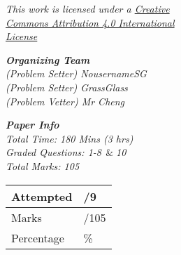 {\begin{multicols*}{2}
  \vspace*{5pt}

  \textit{This work is licensed under a \href{http://creativecommons.org/licenses/by/4.0/}{Creative \\ \hspace*{12pt} Commons Attribution 4.0 International \\ \hspace*{12pt} License}}

  \textit{\textbf{\Large{Organizing Team}} \\
        \large
        \hspace*{12pt} (Problem Setter) NousernameSG \\
        \hspace*{12pt} (Problem Setter) GrassGlass \\
        \hspace*{12pt} (Problem Vetter) Mr Cheng \\
  }

  \textit{\textbf{\Large{Paper Info}} \\
        \large
        \hspace*{12pt} Total Time: 180 Mins (3 hrs) \\
        \hspace*{12pt} Graded Questions: 1-8\(\;\,\&\;\)10 \\
        \hspace*{12pt} Total Marks: 105
  }
        \vspace*{5pt}

        \begin{tabularx}{0.37\textwidth} {
          | >{\centering\arraybackslash}X
          | >{\centering\arraybackslash}X | }
          \hline
          Attempted & \phantom{9}/9 \\
          \hline
          Marks & \phantom{105}/105 \\
          \hline
          Percentage & \phantom{100}\% \\
          \hline
      \end{tabularx}
\end{multicols*}
}

\newpage



